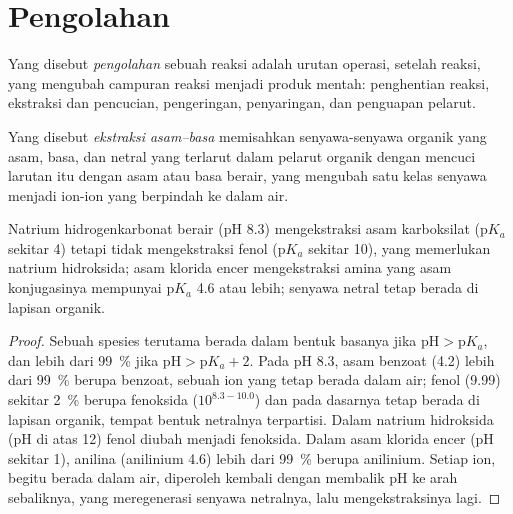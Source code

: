 \section{Pengolahan}

\begin{definition}[Pengolahan]\label{def:b2:lab-techniques-2:work-up}
Yang disebut \emph{pengolahan} sebuah reaksi adalah urutan
operasi, setelah reaksi, yang mengubah campuran reaksi menjadi produk
mentah: penghentian reaksi, ekstraksi dan pencucian, pengeringan,
penyaringan, dan penguapan pelarut.
\end{definition}

\begin{definition}\label{def:b2:lab-techniques-2:acid-base-extraction}
Yang disebut \emph{ekstraksi asam--basa}
memisahkan senyawa-senyawa organik yang asam, basa, dan netral yang terlarut
dalam pelarut organik dengan mencuci larutan itu dengan asam atau basa
berair, yang mengubah satu kelas senyawa menjadi ion-ion yang berpindah ke
dalam air.
\end{definition}

\begin{proposition}\label{prop:b2:lab-techniques-2:acid-base-extraction}
Natrium hidrogenkarbonat berair (pH 8.3) mengekstraksi asam karboksilat
($\mathrm pK_a$ sekitar 4) tetapi tidak mengekstraksi fenol ($\mathrm pK_a$
sekitar 10), yang memerlukan natrium hidroksida; asam klorida encer
mengekstraksi amina yang asam konjugasinya mempunyai $\mathrm pK_a$ 4.6 atau
lebih; senyawa netral tetap berada di lapisan organik.
\end{proposition}

\begin{proof}
Sebuah spesies terutama berada dalam bentuk basanya jika $\mathrm{pH} > \mathrm pK_a$,
dan lebih dari 99~\% jika
$\mathrm{pH} > \mathrm pK_a + 2$. Pada pH 8.3, asam benzoat (4.2) lebih dari
99~\% berupa benzoat, sebuah ion yang tetap berada dalam air; fenol (9.99)
sekitar 2~\% berupa fenoksida ($10^{8.3 - 10.0}$) dan pada dasarnya tetap
berada di lapisan organik, tempat bentuk netralnya terpartisi. Dalam natrium
hidroksida (pH di atas 12) fenol diubah menjadi fenoksida. Dalam asam
klorida encer (pH sekitar 1), anilina (anilinium 4.6) lebih dari
99~\% berupa anilinium. Setiap ion, begitu berada dalam air, diperoleh
kembali dengan membalik pH ke arah sebaliknya, yang meregenerasi senyawa
netralnya, lalu mengekstraksinya lagi.
\end{proof}

